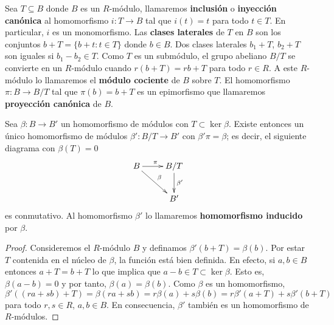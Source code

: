 Sea \(T \subseteq B\) donde $B$ es un $R$-módulo, llamaremos \textbf{inclusión}
o \textbf{inyección canónica} al homomorfismo $i: T \rightarrow B$ tal que
$i(t) = t$ para todo $t \in T$. En particular, $i$ es un monomorfismo. Las
\textbf{clases laterales} de $T$ en $B$ son los conjuntos $b + T = \{b + t : t
	\in T\}$ donde $b \in B$. Dos clases laterales $b_1 + T$, $b_2 + T$ son iguales
si $b_1 - b_2 \in T$. Como $T$ es un submódulo, el grupo abeliano $B/T$ se
convierte en un $R$-módulo cuando $r(b+T) = rb + T$ para todo $r \in R$. A este
$R$-módulo lo llamaremos el \textbf{módulo cociente} de $B$ sobre $T$. El
homomorfismo $\pi: B \rightarrow B/T$ tal que $\pi(b) = b + T$ es un
epimorfismo que llamaremos \textbf{proyección canónica} de $B$.

\begin{proposicion}
	\label{prop:teo-fact}
	Sea \( \beta: B \rightarrow B' \) un homomorfismo de módulos con \( T \subset \ker \beta \). Existe entonces un único homomorfismo de módulos \( \beta': B/T \rightarrow B' \) con \( \beta'\pi = \beta \); es decir, el siguiente diagrama con \( \beta(T) = 0 \)
	\begin{equation}
		\label{firstisothm}
		\xymatrix{
			B \ar[r]^\pi \ar[dr]^\beta & B/T \ar[d]^{\beta'} \\
			& B'
		}
	\end{equation}
	es conmutativo. Al homomorfismo $\beta'$ lo llamaremos \textbf{homomorfismo inducido} por $\beta$.
\end{proposicion}
\begin{proof}
	Consideremos el $R$-módulo $B$ y definamos \( \beta'(b + T) = \beta(b) \). Por estar $T$ contenida en el núcleo de $\beta$, la función está bien definida. En efecto, si $a,b \in B$ entonces $a+T = b+T$ lo que implica que $a-b \in T \subset \ker \beta$. Esto es, $\beta(a-b) = 0$ y por tanto, $\beta(a)=\beta(b)$. Como $\beta$ es un homomorfismo, $$\beta'((ra + sb) + T) = \beta(ra+sb) = r\beta(a) + s\beta(b) = r \beta'(a+T) + s \beta'(b+T)$$ para todo $r,s \in R$, $a,b \in B$. En consecuencia, $\beta'$ también es un homomorfismo de $R$-módulos.
\end{proof}
